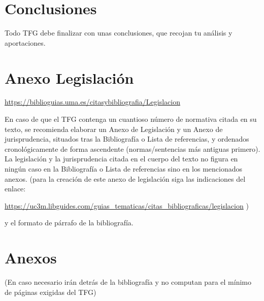 \documentclass[13pt,a4paper]{report}
\begin{document}
\section{Conclusiones} 

\vspace{12pt}

Todo TFG debe finalizar con unas conclusiones, que recojan tu análisis y aportaciones.



\renewcommand{\bibname}{\fontsize{16}{20}\selectfont Bibliografía} %
\renewcommand{\bibfont}{\fontsize{13}{15}\selectfont} %

\vspace{12pt}

\section{Anexo Legislación}

\vspace{12pt}

\href{https://biblioguias.uma.es/citasybibliografia/Legislacion}{https://biblioguias.uma.es/citasybibliografia/Legislacion} 

\vspace{12pt}

En caso de que el TFG contenga un cuantioso número de normativa citada en su texto, se recomienda elaborar un Anexo de Legislación y un Anexo de jurisprudencia, situados tras la Bibliografía o Lista de referencias, y ordenados cronológicamente de forma ascendente (normas/sentencias más antiguas primero). La legislación y la jurisprudencia citada en el cuerpo del texto no figura en ningún caso en la Bibliografía o Lista de referencias sino en los mencionados anexos.
(para la creación de este anexo de legislación siga las indicaciones del enlace:

\vspace{12pt}

\href{https://uc3m.libguides.com/guias\_tematicas/citas\_bibliograficas/legislacion}{https://uc3m.libguides.com/guias\_tematicas/citas\_bibliograficas/legislacion}
 ) 

 \vspace{12pt}

y el formato de párrafo de la bibliografía.

\vspace{12pt}

\section{Anexos}

(En caso necesario irán detrás de la bibliografía y no computan para el mínimo de páginas exigidas del TFG)
\end{document}
